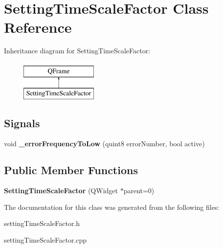\hypertarget{class_setting_time_scale_factor}{}\section{Setting\+Time\+Scale\+Factor Class Reference}
\label{class_setting_time_scale_factor}
Inheritance diagram for Setting\+Time\+Scale\+Factor\+:\begin{figure}[H]
\begin{center}
\leavevmode
\includegraphics[height=2.000000cm]{class_setting_time_scale_factor}
\end{center}
\end{figure}
\subsection*{Signals}
\begin{DoxyCompactItemize}
\item 
\mbox{\label{class_setting_time_scale_factor_a97540bb6eb81124d7c7378975c537a57}} 
void {\bfseries \+\_\+error\+Frequency\+To\+Low} (quint8 error\+Number, bool active)
\end{DoxyCompactItemize}
\subsection*{Public Member Functions}
\begin{DoxyCompactItemize}
\item 
\mbox{\label{class_setting_time_scale_factor_ab89d2c4976d3953229e0b16b383ab635}} 
{\bfseries Setting\+Time\+Scale\+Factor} (Q\+Widget $\ast$parent=0)
\end{DoxyCompactItemize}


The documentation for this class was generated from the following files\+:\begin{DoxyCompactItemize}
\item 
setting\+Time\+Scale\+Factor.\+h\item 
setting\+Time\+Scale\+Factor.\+cpp\end{DoxyCompactItemize}
